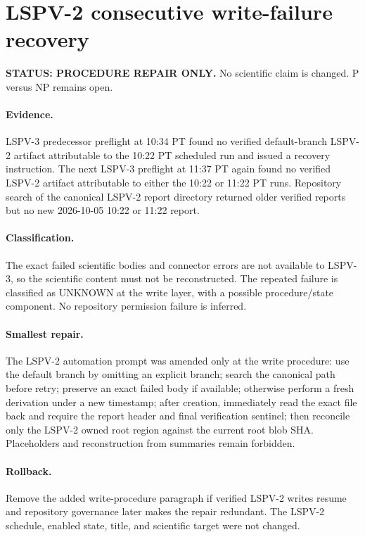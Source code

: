 \documentclass[11pt]{article}
\begin{document}
\section*{LSPV-2 consecutive write-failure recovery}
\textbf{STATUS: PROCEDURE REPAIR ONLY.} No scientific claim is changed. P versus NP remains open.

\paragraph{Evidence.}
LSPV-3 predecessor preflight at 10:34 PT found no verified default-branch LSPV-2 artifact attributable to the 10:22 PT scheduled run and issued a recovery instruction. The next LSPV-3 preflight at 11:37 PT again found no verified LSPV-2 artifact attributable to either the 10:22 or 11:22 PT runs. Repository search of the canonical LSPV-2 report directory returned older verified reports but no new 2026-10-05 10:22 or 11:22 report.

\paragraph{Classification.}
The exact failed scientific bodies and connector errors are not available to LSPV-3, so the scientific content must not be reconstructed. The repeated failure is classified as UNKNOWN at the write layer, with a possible procedure/state component. No repository permission failure is inferred.

\paragraph{Smallest repair.}
The LSPV-2 automation prompt was amended only at the write procedure: use the default branch by omitting an explicit branch; search the canonical path before retry; preserve an exact failed body if available; otherwise perform a fresh derivation under a new timestamp; after creation, immediately read the exact file back and require the report header and final verification sentinel; then reconcile only the LSPV-2 owned root region against the current root blob SHA. Placeholders and reconstruction from summaries remain forbidden.

\paragraph{Rollback.}
Remove the added write-procedure paragraph if verified LSPV-2 writes resume and repository governance later makes the repair redundant. The LSPV-2 schedule, enabled state, title, and scientific target were not changed.

\end{document}

